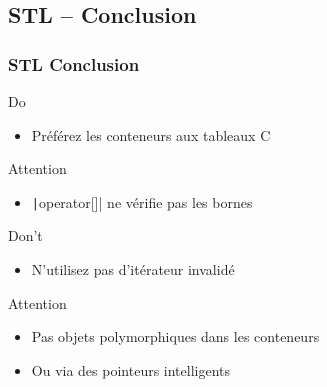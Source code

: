 \documentclass[C++.tex]{subfiles}
\begin{document}
\subsection*{STL -- Conclusion}
\begin{frame}[fragile]
	\frametitle{STL Conclusion}
	\begin{exampleblock}{Do}
		\begin{itemize}
			\item Préférez les conteneurs aux tableaux C
		\end{itemize}
	\end{exampleblock}

	\begin{alertblock}{Attention}
		\begin{itemize}
			\item \texttt|operator[]| ne vérifie pas les bornes
		\end{itemize}

	\end{alertblock}

	\begin{alertblock}{Don't}
		\begin{itemize}
			\item N'utilisez pas d'itérateur invalidé
		\end{itemize}

	\end{alertblock}

	\begin{alertblock}{Attention}
		\begin{itemize}
			\item Pas objets polymorphiques dans les conteneurs
			\item Ou via des pointeurs intelligents
		\end{itemize}
	\end{alertblock}
\end{frame}
\end{document}
